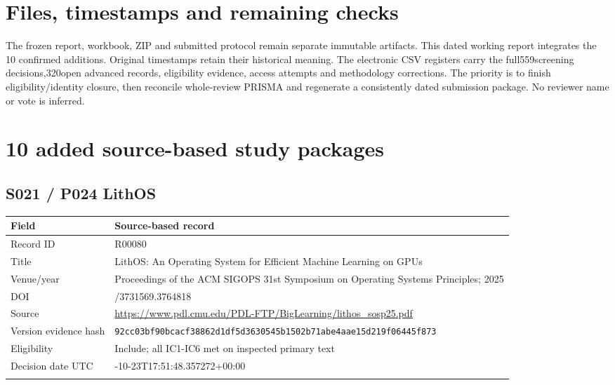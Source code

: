 \section{Files, timestamps and remaining checks}
The frozen report, workbook, ZIP and submitted protocol remain separate immutable artifacts. This dated working report integrates the 10 confirmed additions. Original timestamps retain their historical meaning. The electronic CSV registers carry the full559screening decisions,320open advanced records, eligibility evidence, access attempts and methodology corrections. The priority is to finish eligibility/identity closure, then reconcile whole-review PRISMA and regenerate a consistently dated submission package. No reviewer name or vote is inferred.
\clearpage\section{10 added source-based study packages}\label{app:additions}
\clearpage\subsection{S021 / P024 LithOS}
\cite{s021}
\begin{longtable}{>{\raggedright\arraybackslash}p{}>{\raggedright\arraybackslash}p{}}
\toprule
\textbf{Field} & \textbf{Source-based record}\\\midrule\endhead
Record ID & R00080\\\addlinespace
Title & LithOS: An Operating System for Efficient Machine Learning on GPUs\\\addlinespace
Venue/year & Proceedings of the ACM SIGOPS 31st Symposium on Operating Systems Principles;\allowbreak{} 2025\\\addlinespace
DOI & 10.1145/3731569.3764818\\\addlinespace
Source & \url{https://www.pdl.cmu.edu/PDL-FTP/BigLearning/lithos_sosp25.pdf}\\\addlinespace
Version evidence hash & \nolinkurl{92cc03bf90bcacf38862d1df5d3630545b1502b71abe4aae15d219f06445f873}\\\addlinespace
Eligibility & Include;\allowbreak{} all IC1-IC6 met on inspected primary text\\\addlinespace
Decision date UTC & 2026-10-23T17:51:48.357272+00:00\\\addlinespace
\bottomrule\end{longtable}
